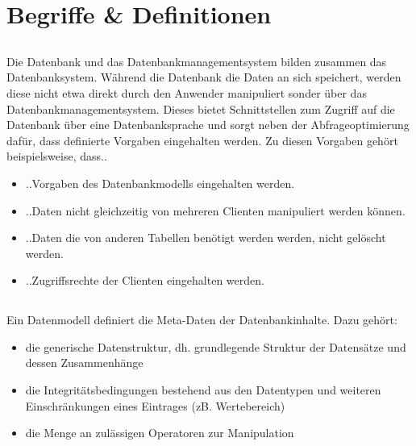 
\newcommand{\dozent}{Prof. Dr. Agnès Voisard \\ Nicolas Lehmann}					%
\newcommand{\tutor}{Alexander Schulz}						%
\newcommand{\tutoriumNo}{04}				%
\newcommand{\ubungNo}{01}									%
\newcommand{\veranstaltung}{Datenbanksysteme}	%
\newcommand{\semester}{SoSe 18}						%
\newcommand{\studenten}{Eduard Beiline, Mark Niehues, Antoen Oehler}			%



\section{Begriffe \& Definitionen}
\subsection{}
Die Datenbank und das Datenbankmanagementsystem bilden zusammen das Datenbanksystem. Während die Datenbank die Daten an sich speichert, werden diese nicht etwa direkt durch den Anwender manipuliert sonder über das Datenbankmanagementsystem. Dieses bietet Schnittstellen zum Zugriff auf die Datenbank über eine Datenbanksprache und sorgt neben der Abfrageoptimierung dafür, dass definierte Vorgaben eingehalten werden. Zu diesen Vorgaben gehört beispielsweise, dass..
\begin{itemize}
\item ..Vorgaben des Datenbankmodells eingehalten werden.
\item ..Daten nicht gleichzeitig von mehreren Clienten manipuliert werden können.
\item ..Daten die von anderen Tabellen benötigt werden werden, nicht gelöscht werden.
\item ..Zugriffsrechte der Clienten eingehalten werden.
\end{itemize}

\subsection{}
Ein Datenmodell definiert die Meta-Daten der Datenbankinhalte. Dazu gehört:
\begin{itemize}
\item die generische Datenstruktur, dh. grundlegende Struktur der Datensätze und dessen Zusammenhänge
\item die Integritätsbedingungen bestehend aus den Datentypen und weiteren Einschränkungen eines Eintrages (zB. Wertebereich)
\item die Menge an zulässigen Operatoren zur Manipulation
\end{itemize}

